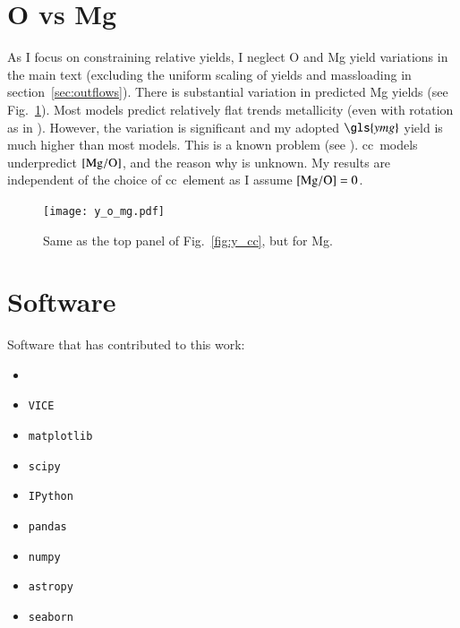 \documentclass[12pt,oneside,letterpaper]{report}
\newcommand{\cc}{\gls{cc}}
\newcommand{\Yoc}{\gls{ymg}}
\newcommand{\VICE}{\texttt{VICE}}
\begin{document}
\newpage
\section{O vs Mg}\label{sec:alt_agb}

As I focus on constraining relative yields, I neglect O and Mg yield variations in the main text (excluding the uniform scaling of yields and \gls{massloading} in section~\ref{sec:outflows}). There is substantial variation in predicted Mg yields (see Fig.~\ref{fig:y_mg}). Most models predict relatively flat trends metallicity (even with rotation as in \citealt{LC18}). However, the variation is significant and my adopted $\Yoc$ yield is much higher than most models. This is a known problem (see \citealt{emily+21}). \cc\ models underpredict $[{\rm Mg}/{\rm O}]$, and the reason why is unknown. My results are independent of the choice of \cc\ element as I assume $[{\rm Mg}/{\rm O}]=0$.



\begin{figure}[htp]
    \centering
    \texttt{[image: y\_o\_mg.pdf]}
    \caption[Magnesium yields]{Same as the top panel of Fig.~\ref{fig:y_cc}, but for Mg.
    }
    \label{fig:y_mg}
\end{figure}



\newpage

\section{Software}

Software that has contributed to this work:

\begin{itemize}
    \item \citet{OhioSupercomputerCenter1987}
    \item \VICE~\citep{JW20, james+21}
    \item \texttt{matplotlib} \citep{matplotlib}
    \item \texttt{scipy} \citep{scipy}
    \item \texttt{IPython} \citep{ipy}
    \item \texttt{pandas} \citep{pandas}
    \item \texttt{numpy} \citep{numpy}
    \item \texttt{astropy} \citep{astropy:2013, astropy:2018, astropy:2022}
    \item \texttt{seaborn} \citep{seaborn}
\end{itemize}




\renewcommand*{\arraystretch}{1.8}
\glsaddall[types={symbols}]
\renewcommand{\glslongextraSymDescTabularHeader}{}
\renewcommand{\glslongextraSymDescTabularFooter}{}

\printunsrtglossary[type=symbols,nonumberlist,style=long-sym-desc]


\renewcommand*{\arraystretch}{1}
\printglossary[type=models,nonumberlist]
\label{sec:oob_models}

\printglossary[type=\acronymtype,nonumberlist]


\printglossary
\end{document}
